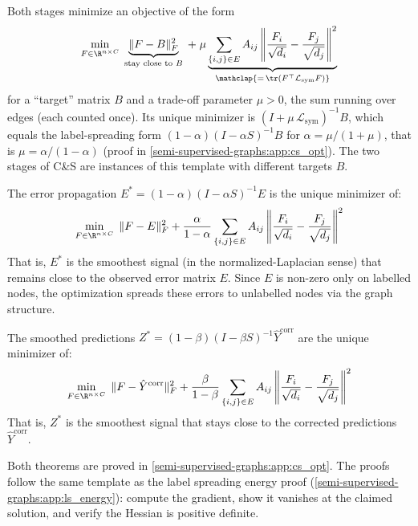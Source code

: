\begin{notechapter}
Both stages minimize an objective of the form
\begin{equation}
\label{semi-supervised-graphs:eq:cs_general_opt}
\min_{F \in \R^{n \times C}}\;
\underbrace{\|F - B\|_F^2}_{\text{stay close to }B}
\;+\; \mu \underbrace{\sum_{\{i,j\}\in E}A_{ij}
\left\|\frac{F_i}{\sqrt{d_i}} - \frac{F_j}{\sqrt{d_j}}\right\|^2}_{
\mathclap{=\,\tr(F^\top \mathcal{L}_{\mathrm{sym}} F)}}
\end{equation}
for a ``target'' matrix $B$ and a trade-off parameter $\mu > 0$, the sum running over edges (each counted once). Its unique minimizer is $(I + \mu\,\mathcal{L}_{\mathrm{sym}})^{-1}B$, which equals the label-spreading form $(1-\alpha)(I - \alpha S)^{-1}B$ for $\alpha = \mu/(1+\mu)$, that is $\mu = \alpha/(1-\alpha)$ (proof in \cref{semi-supervised-graphs:app:cs_opt}). The two stages of C\&S are instances of this template with different targets $B$.

\begin{theorem}
\label{semi-supervised-graphs:thm:cs_correct_opt}
The error propagation $E^* = (1-\alpha)(I - \alpha S)^{-1}E$ is the unique
minimizer of:
\begin{equation}
\min_{F \in \R^{n \times C}}\; \|F - E\|_F^2
  + \frac{\alpha}{1-\alpha}\sum_{\{i,j\}\in E}A_{ij}
  \left\|\frac{F_i}{\sqrt{d_i}} - \frac{F_j}{\sqrt{d_j}}\right\|^2
\end{equation}
That is, $E^*$ is the smoothest signal (in the normalized-Laplacian sense) that
remains close to the observed error matrix $E$. Since $E$ is non-zero only on
labelled nodes, the optimization spreads these errors to unlabelled nodes via the
graph structure.
\end{theorem}

\begin{theorem}
\label{semi-supervised-graphs:thm:cs_smooth_opt}
The smoothed predictions $Z^* = (1-\beta)(I - \beta S)^{-1}\hat{Y}^{\text{corr}}$
are the unique minimizer of:
\begin{equation}
\min_{F \in \R^{n \times C}}\; \|F - \hat{Y}^{\text{corr}}\|_F^2
  + \frac{\beta}{1-\beta}\sum_{\{i,j\}\in E}A_{ij}
  \left\|\frac{F_i}{\sqrt{d_i}} - \frac{F_j}{\sqrt{d_j}}\right\|^2
\end{equation}
That is, $Z^*$ is the smoothest signal that stays close to the corrected
predictions $\hat{Y}^{\text{corr}}$.
\end{theorem}

Both theorems are proved in \cref{semi-supervised-graphs:app:cs_opt}. The proofs follow the
same template as the label spreading energy proof
(\cref{semi-supervised-graphs:app:ls_energy}): compute the gradient, show it vanishes at the
claimed solution, and verify the Hessian is positive definite.


\end{notechapter}
